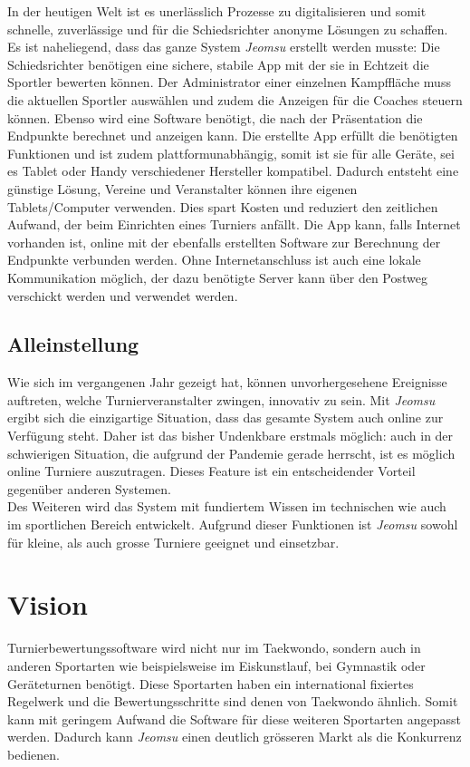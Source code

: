 In der heutigen Welt ist es unerlässlich Prozesse zu digitalisieren und somit schnelle,
    zuverlässige und für die Schiedsrichter anonyme Lösungen zu schaffen.
\\
Es ist naheliegend, dass das ganze System \textit{Jeomsu} erstellt werden musste:
Die Schiedsrichter benötigen eine sichere, stabile App mit der sie in Echtzeit die Sportler bewerten können.
Der Administrator einer einzelnen Kampffläche muss die aktuellen Sportler auswählen und zudem die Anzeigen für die
Coaches steuern können.
Ebenso wird eine Software benötigt, die nach der Präsentation die Endpunkte berechnet und anzeigen kann. 
Die erstellte App erfüllt die benötigten Funktionen und ist zudem plattformunabhängig, somit ist sie für alle Geräte,
    sei es Tablet oder Handy verschiedener Hersteller kompatibel.
Dadurch entsteht eine günstige Lösung, Vereine und Veranstalter können ihre eigenen Tablets/Computer verwenden.
Dies spart Kosten und reduziert den zeitlichen Aufwand, der beim Einrichten eines Turniers anfällt.
Die App kann, falls Internet vorhanden ist, online mit der ebenfalls erstellten Software zur Berechnung der Endpunkte verbunden werden.
Ohne Internetanschluss ist auch eine lokale Kommunikation möglich, der dazu benötigte Server kann über den
    Postweg verschickt werden und verwendet werden.

\subsection{Alleinstellung}

Wie sich im vergangenen Jahr gezeigt hat, können unvorhergesehene Ereignisse auftreten, welche Turnierveranstalter
    zwingen, innovativ zu sein.
Mit \textit{Jeomsu} ergibt sich die einzigartige Situation, dass das gesamte System auch online zur Verfügung steht.
Daher ist das bisher Undenkbare erstmals möglich: auch in der schwierigen Situation, die aufgrund der Pandemie gerade
herrscht, ist es möglich online Turniere auszutragen.
Dieses Feature ist ein entscheidender Vorteil gegenüber anderen Systemen.
\\
Des Weiteren wird das System mit fundiertem Wissen im technischen wie auch im sportlichen Bereich entwickelt.
Aufgrund dieser Funktionen ist \textit{Jeomsu} sowohl für kleine, als auch grosse Turniere geeignet und einsetzbar.

\section{Vision}

Turnierbewertungssoftware wird nicht nur im Taekwondo, sondern auch in anderen Sportarten wie beispielsweise im Eiskunstlauf,
    bei Gymnastik oder Geräteturnen benötigt.
Diese Sportarten haben ein international fixiertes Regelwerk und die Bewertungsschritte sind denen von Taekwondo ähnlich.
Somit kann mit geringem Aufwand die Software für diese weiteren Sportarten angepasst werden.
Dadurch kann \textit{Jeomsu} einen deutlich grösseren Markt als die Konkurrenz bedienen.